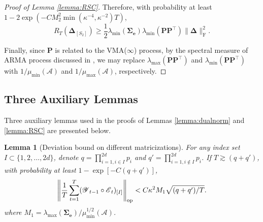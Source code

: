 \documentclass[12pt]{article}
\newtheorem{lemma}{Lemma}
\newcommand{\bm}{\boldsymbol}
\newcommand{\cm}[1]{\mbox{\boldmath$\mathscr{#1}$}}
\begin{document}
\begin{proof}[Proof of Lemma \ref{lemma:RSC}]
	Therefore, with probability at least $1-2\exp(-CM_2^2\min(\kappa^{-4},\kappa^{-2})T)$,
	\begin{equation}
	R_T(\bm{\Delta}_{[S_2]})\geq\frac{1}{2}\lambda_{\min}(\bm{\Sigma_e})\lambda_{\min}(\bm{PP}^\top)\|\bm{\Delta}\|_{\text{F}}^2.
	\end{equation}
	
	Finally, since $\bm{P}$ is related to the VMA($\infty$) process, by the spectral measure of ARMA process discussed in \citet{basu2015regularized}, we may replace $\lambda_{\max}(\bm{P}\bm{P}^\top)$ and $\lambda_{\min}(\bm{P}\bm{P}^\top)$ with $1/\mu_{\min}(\mathcal{A})$ and $1/\mu_{\max}(\mathcal{A})$, respectively.
\end{proof}



\subsection{Three Auxiliary Lemmas \label{subsec:auxlemma}}
Three auxiliary lemmas used in the proofs of Lemmas  \ref{lemma:dualnorm} and \ref{lemma:RSC} are presented below.


\begin{lemma}[Deviation bound on different matricizations]
	\label{lemma:deviation}
	For any index set $I\subset\{1,2,\dots,2d\}$, denote $q=\prod_{i=1,i\in I}^{2d}p_i$ and $q'=\prod_{i=1,i\notin I}^{2d}p_i$. If $T\gtrsim(q+q')$, with probability at least $1-\exp[-C(q+q')]$,
	\begin{equation}
	\left\|\frac{1}{T}\sum_{t=1}^T(\cm{Y}_{t-1}\circ\cm{E}_t)_{[I]}\right\|_{\textup{op}}<C\kappa^2M_1\sqrt{(q+q')/T}.
	\end{equation}
	where $M_1=\lambda_{\max}(\bm{\Sigma_e})/\mu^{1/2}_{\min}(\mathcal{A})$.
\end{lemma}
\end{document}
